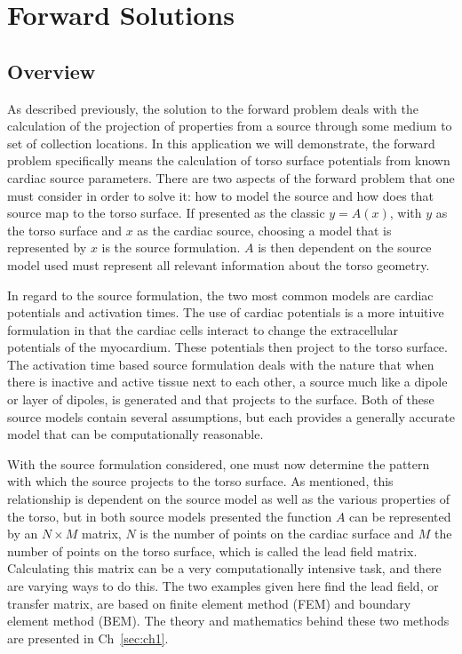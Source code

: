 \chapter{Forward Solutions}

\section{Overview}

As described previously, the solution to the forward problem deals with the calculation of the projection of properties from a source through some medium to set of collection locations.  In this application we will demonstrate, the forward problem specifically means the calculation of torso surface potentials from known cardiac source parameters.  There are two aspects of the forward problem that one must consider in order to solve it: how to model the source and how does that source map to the torso surface.  If presented as the classic $y=A(x)$,  with $y$ as the torso surface and $x$ as the cardiac source, choosing a model that is represented by $x$ is the source formulation.  $A$ is then dependent on the source model used must represent all relevant information about the torso geometry.

In regard to the source formulation, the two most common models are cardiac potentials and activation times.  The use of cardiac potentials is a more intuitive formulation in that the cardiac cells interact to change the extracellular potentials of the myocardium.  These potentials then project to the torso surface.  The activation time based source formulation deals with the nature that when there is inactive and active tissue next to each other, a source much like a dipole or layer of dipoles, is generated and that projects to the surface.  Both of these source models contain several assumptions, but each provides a generally accurate model that can be computationally reasonable.  

With the source formulation considered, one must now determine the pattern with which the source projects to the torso surface.  As mentioned, this relationship is dependent on the source model as well as the various properties of the torso, but in both source models presented the function $A$ can be represented by an $N \times M$ matrix, $N$ is the number of points on the cardiac surface and $M$ the number of points on the torso surface, which is called the lead field matrix.  Calculating this matrix can be a very computationally intensive task, and there are varying ways to do this.  The two examples given here find the lead field, or transfer matrix, are based on finite element method (FEM) and boundary element method (BEM).  The theory and mathematics behind these two methods are presented in Ch~\ref{sec:ch1}.

